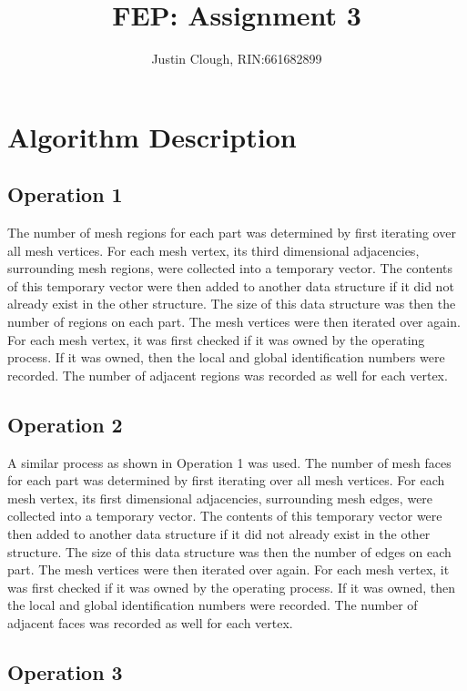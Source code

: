 \documentclass[a4paper, 12pt]{article}
\author{Justin Clough, RIN:661682899}
\title{FEP: Assignment 3}
\begin{document}
\maketitle

\section*{Algorithm Description}

\subsection*{Operation 1} \label{sec:sub:op1}

The number of mesh regions for each part was determined by 
first iterating over all mesh vertices. For each mesh vertex, 
its third dimensional adjacencies, surrounding mesh regions, were 
collected into a temporary vector. The contents of this temporary 
vector were then added to another data structure if it did not 
already exist in the other structure. The size of this data 
structure was then the number of regions on each part. The mesh
vertices were then iterated over again. For each mesh vertex, 
it was first checked if it was owned by the operating process. 
If it was owned, then the local and global identification numbers 
were recorded. The number of adjacent regions was recorded as well 
for each vertex.

\subsection*{Operation 2} \label{sec:sub:op2}

A similar process as shown in Operation 1 was used. The number of
mesh faces for each part was determined by first iterating over all mesh
vertices. For each mesh vertex, 
its first dimensional adjacencies, surrounding mesh edges, were 
collected into a temporary vector. The contents of this temporary 
vector were then added to another data structure if it did not 
already exist in the other structure. The size of this data 
structure was then the number of edges on each part. The mesh
vertices were then iterated over again. For each mesh vertex, 
it was first checked if it was owned by the operating process. 
If it was owned, then the local and global identification numbers 
were recorded. The number of adjacent faces was recorded as well 
for each vertex.

\subsection*{Operation 3} \label{sec:sub:op3}
\end{document}
